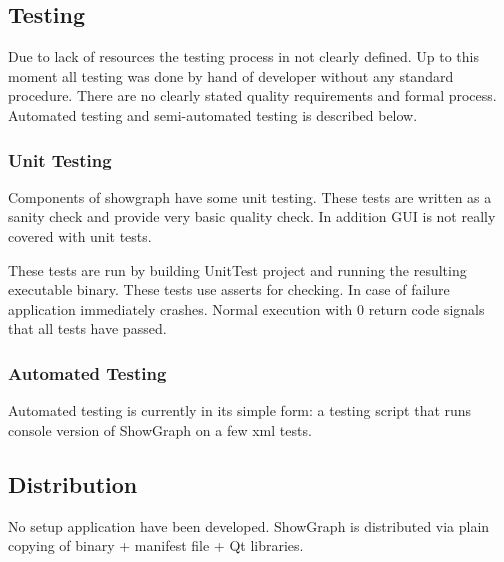 \documentclass[11pt,twoside,a4paper]{article}
\begin{document}
\subsection{Testing}
Due to lack of resources the testing process in not clearly defined. Up to this moment all testing was done by hand of developer without any standard procedure. There are no clearly stated quality requirements and formal process. Automated testing and semi-automated testing is described below.

\subsubsection{Unit Testing}
Components of showgraph have some unit testing. These tests are written as a sanity check and provide very basic quality check. In addition GUI is not really covered with unit tests.

These tests are run by building UnitTest project and running the resulting executable binary. These tests use asserts for checking. In case of failure application immediately crashes. Normal execution with 0 return code signals that all tests have passed.

\subsubsection{Automated Testing}
Automated testing is currently in its simple form: a testing script that runs console version of ShowGraph on a few xml tests.

\subsection{Distribution}
No setup application have been developed. ShowGraph is distributed via plain copying of binary + manifest file + Qt libraries.
\end{document}
